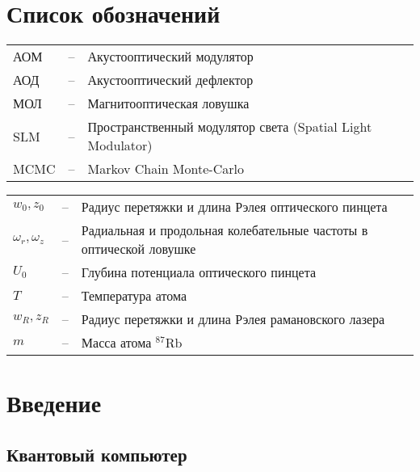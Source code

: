 

\section*{Список обозначений}

\begin{tabular}{lll}
	АОМ & -- & Акустооптический модулятор \\
	АОД & -- & Акустооптический дефлектор \\
	МОЛ & -- & Магнитооптическая ловушка \\



	SLM & -- & Пространственный модулятор света (Spatial Light Modulator) \\
	MCMC & -- & Markov Chain Monte-Carlo \\
\end{tabular}

\begin{tabular}{lll}
	$w_0, z_0$ & -- & Радиус перетяжки и длина Рэлея оптического пинцета \\
	$\omega_r, \omega_z$ & -- & Радиальная и продольная колебательные частоты в оптической ловушке \\
	$U_0$ & -- & Глубина потенциала оптического пинцета \\
	$T$ & -- & Температура атома \\
	$w_{R}, z_{R}$ & -- & Радиус перетяжки и длина Рэлея рамановского лазера \\
	$m$ & -- & Масса атома $^{87}\text{Rb}$ \\
\end{tabular}


\newpage



\section{Введение}
\label{sec:Introduction} 


\subsection{Квантовый компьютер}

